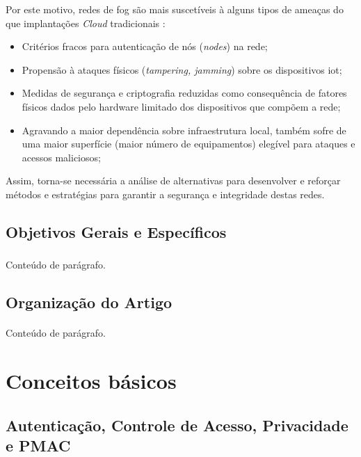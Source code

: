 \documentclass[12pt]{article}
\begin{document}
Por este motivo, redes de \gls{fog} são mais suscetíveis à alguns tipos de ameaças do que implantações \textit{Cloud}
tradicionais \cite{alhazmi2019,srirama2024,khan2017}:
\begin{itemize}
  \item Critérios fracos para autenticação de nós (\textit{nodes}) na rede;
  \item Propensão à ataques físicos (\textit{tampering, jamming}) sobre os dispositivos \gls{iot};
  \item Medidas de segurança e criptografia reduzidas como consequência de  fatores físicos dados pelo hardware limitado
    dos dispositivos que compõem a rede;
  \item Agravando a maior dependência sobre infraestrutura local, também sofre de uma maior superfície (maior número de equipamentos)
    elegível para ataques e acessos maliciosos;
\end{itemize}

Assim, torna-se necessária a análise de alternativas para desenvolver e reforçar métodos e estratégias para garantir a
segurança e integridade destas redes.

\subsection{Objetivos Gerais e Específicos}
\subsubsection{}
\paragraph{}
Conteúdo de parágrafo.

\subsection{Organização do Artigo}
\paragraph{}
Conteúdo de parágrafo.

\section{Conceitos básicos}
\subsection{Autenticação, Controle de Acesso, Privacidade e PMAC}
\end{document}
